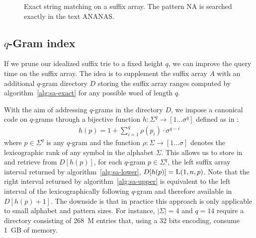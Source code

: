 \begin{figure}[h]
\begin{center}
\caption[Exact string matching on a suffix array.]{Exact string matching on a suffix array. The pattern NA is searched exactly in the text ANANAS.}
\label{fig:sa-exact}
%
\end{center}
\end{figure}

\subsection{$q$-Gram index}

If we prune our idealized suffix trie to a fixed height $q$, we can improve the query time on the suffix array.
The idea is to supplement the suffix array $A$ with an additional $q$-gram directory $D$ storing the suffix array ranges computed by algorithm~\ref{alg:sa-exact} for any possible word of length $q$.

With the aim of addressing $q$-grams in the directory $D$, we impose a canonical code on $q$-grams through a bijective function $h : \Sigma^q \rightarrow [1 \dots \sigma^q]$ defined as in \citep{Knuth1973}:
\begin{eqnarray}
h(p) = 1 + \sum_{i=1}^{q}{\rho(p_i) \cdot \sigma^{q-i}}
\end{eqnarray}
where $p \in \Sigma^q$ is any $q$-gram and the function $\rho : \Sigma \rightarrow [1 \dots \sigma]$ denotes the lexicographic rank of any symbol in the alphabet $\Sigma$.
This allows us to store in and retrieve from $D[h(p)]$, for each $q$-gram $p \in \Sigma^q$, the left suffix array interval returned by algorithm~\ref{alg:sa-lower}, \ie $D[h(p)] = \textsc{L}(1,n,p)$.
Note that the right interval returned by algorithm~\ref{alg:sa-upper} is equivalent to the left interval of the lexicographically following $q$-gram and therefore available in $D[h(p)+1]$.
The downside is that in practice this approach is only applicable to small alphabet and pattern sizes.
For instance, $|\Sigma| = 4$ and $q=14$ require a directory consisting of 268~M entries that, using a 32 bits encoding, consume 1~GB of memory.

